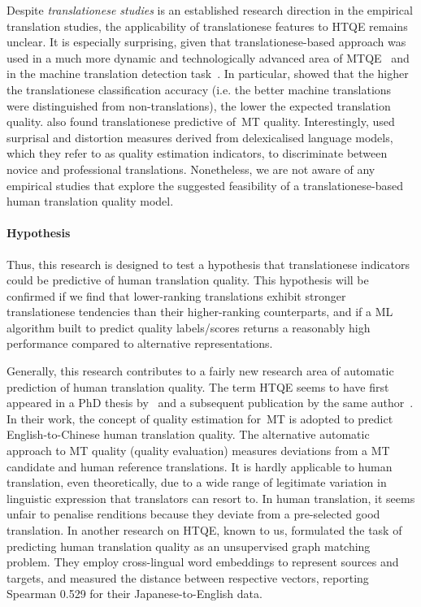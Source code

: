 Despite \textit{translationese studies} is an established research direction in the empirical translation studies, the applicability of translationese features to \gls{HTQE} remains unclear. It is especially surprising, given that translationese-based approach was used in a much more dynamic and technologically advanced area of \gls{MTQE}~\cite{Aharoni2015} and in the machine translation detection task~\cite{Carter2012}. In particular, \citet{Aharoni2015} showed that the higher the translationese classification accuracy (i.e. the better machine translations were distinguished from non-translations), the lower the expected translation quality. \citet{Aranberri2020} also found translationese predictive of~\gls{MT} quality. Interestingly, \citet{Rubino2016} used surprisal and distortion measures derived from delexicalised language models, which they refer to as quality estimation indicators, to discriminate between novice and professional translations.
Nonetheless, we are not aware of any empirical studies that explore the suggested feasibility of a translationese-based human translation quality model. %

\paragraph{Hypothesis} Thus, this research is designed to test a hypothesis that translationese indicators could be predictive of human translation quality. This hypothesis will be confirmed if we find that lower-ranking translations exhibit stronger translationese tendencies than their higher-ranking counterparts, and if a ML algorithm built to predict quality labels/scores returns a reasonably high performance compared to alternative representations.  

Generally, this research contributes to a fairly new research area of automatic prediction of human translation quality. The term \gls{HTQE} seems to have first appeared in a PhD thesis by~\citet{Yuan2018} and a subsequent publication by the same author~\cite{Yuan2020}. In their work, the concept of quality estimation for~\gls*{MT} is adopted to predict English-to-Chinese human translation quality. 
The alternative automatic approach to MT quality (quality evaluation) measures deviations from a MT candidate and human reference translations. It is hardly applicable to human translation, even theoretically, due to a wide range of legitimate variation in linguistic expression that translators can resort to. In human translation, it seems unfair to penalise renditions because they deviate from a pre-selected good translation.
In another research on HTQE, known to us, \citet{Zhou2019} formulated the task of predicting human translation quality as an unsupervised graph matching problem. They employ cross-lingual word embeddings to represent sources and targets, and measured the distance between respective vectors, reporting Spearman 0.529 for their Japanese-to-English data. 

